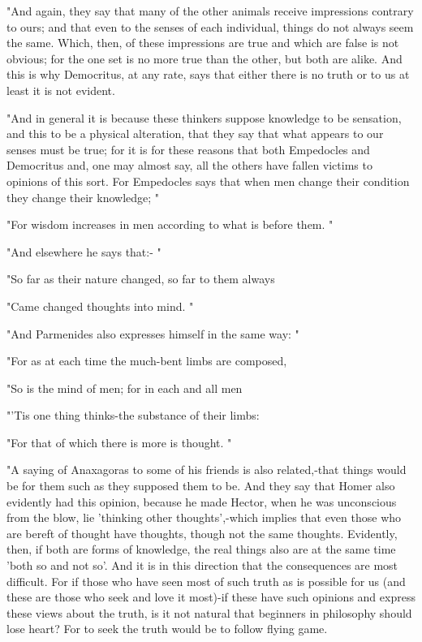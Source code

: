 "And again, they say that many of the other animals receive impressions
contrary to ours; and that even to the senses of each individual,
things do not always seem the same. Which, then, of these impressions
are true and which are false is not obvious; for the one set is no
more true than the other, but both are alike. And this is why Democritus,
at any rate, says that either there is no truth or to us at least
it is not evident. 

"And in general it is because these thinkers suppose knowledge to
be sensation, and this to be a physical alteration, that they say
that what appears to our senses must be true; for it is for these
reasons that both Empedocles and Democritus and, one may almost say,
all the others have fallen victims to opinions of this sort. For Empedocles
says that when men change their condition they change their knowledge;
"

"For wisdom increases in men according to what is before them.
"

"And elsewhere he says that:- "

"So far as their nature changed, so far to them always 

"Came changed thoughts into mind. "

"And Parmenides also expresses himself in the same way: "

"For as at each time the much-bent limbs are composed, 

"So is the mind of men; for in each and all men 

"'Tis one thing thinks-the substance of their limbs: 

"For that of which there is more is thought. "

"A saying of Anaxagoras to some of his friends is also related,-that
things would be for them such as they supposed them to be. And they
say that Homer also evidently had this opinion, because he made Hector,
when he was unconscious from the blow, lie 'thinking other thoughts',-which
implies that even those who are bereft of thought have thoughts, though
not the same thoughts. Evidently, then, if both are forms of knowledge,
the real things also are at the same time 'both so and not so'. And
it is in this direction that the consequences are most difficult.
For if those who have seen most of such truth as is possible for us
(and these are those who seek and love it most)-if these have such
opinions and express these views about the truth, is it not natural
that beginners in philosophy should lose heart? For to seek the truth
would be to follow flying game. 

